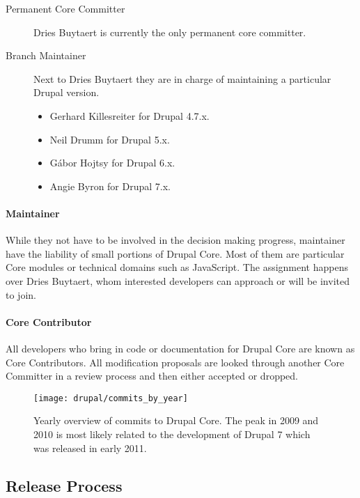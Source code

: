 \begin{description}
  \item[Permanent Core Committer] Dries Buytaert is currently the only permanent core
    committer.
  \item[Branch Maintainer] Next to Dries Buytaert they are in charge of
  maintaining a particular Drupal version.
  \begin{itemize}
    \item Gerhard Killesreiter for Drupal 4.7.x.
    \item Neil Drumm for Drupal 5.x.
    \item Gábor Hojtsy for Drupal 6.x.
    \item Angie Byron for Drupal 7.x.
  \end{itemize}
\end{description}

\paragraph{Maintainer}

While they not have to be involved in the decision making progress, maintainer
have the liability of small portions of Drupal Core. Most of them are
particular Core modules or technical domains such as JavaScript. The assignment
happens over Dries Buytaert, whom interested developers can approach or will be
invited to join.

\paragraph{Core Contributor}

All developers who bring in code or documentation for Drupal Core are known as
Core Contributors. All modification proposals are looked through another Core
Committer in a review process and then either accepted or dropped.

\begin{figure}[htbp]
  \centering
  \texttt{[image: drupal/commits\_by\_year]}
  \caption{Yearly overview of commits to Drupal Core. The peak in 2009 and 2010
  is most likely related to the development of Drupal 7 which was released in
  early 2011.}
\end{figure}


\subsection{Release Process} %

